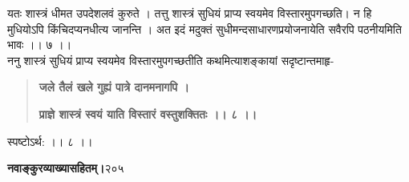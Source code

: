 \documentclass[11pt, openany]{book}
\begin{document}
\begin{sloppypar}
\hangindent=0.2in \hspace{0.2in}यतः शास्त्रं धीमत उपदेशलवं कुरुते । तत्तु शास्त्रं सुधियं प्राप्य स्वयमेव विस्तारमुपगच्छति। न हि मुधियोऽपि किंचिदप्यनधीत्य जानन्ति । अत इदं मदुक्तं सुधीमन्दसाधारणप्रयोजनायेति सवैरपि पठनीयमिति भावः ।। ७ ।।\\ 

\hangindent=0.2in \hspace{0.2in}ननु शास्त्रं सुधियं प्राप्य स्वयमेव विस्तारमुपगच्छतीति कथमित्याशङ्कायां सदृष्टान्तमाहृ- 

\begin{quote}
\hspace{0.5in}\textbf{जले तैलं खले गुह्यं पात्रे दानमनागपि ।}

\hspace{0.5in}\textbf{प्राज्ञे शास्त्रं स्वयं याति विस्तारं वस्तुशक्तितः ।। ८ ।।}
\end{quote}

\hangindent=0.2in \hspace{0.2in}स्पष्टोऽर्थ: ।। ८ ।।
\end{sloppypar}
\thispagestyle{empty}
\newpage

\onehalfspacing
\hspace{2in}\textbf{नवाङ्कुरव्याख्यासहितम्।}\hspace{2in}२०५ 

\vspace{5mm}
\end{document}
